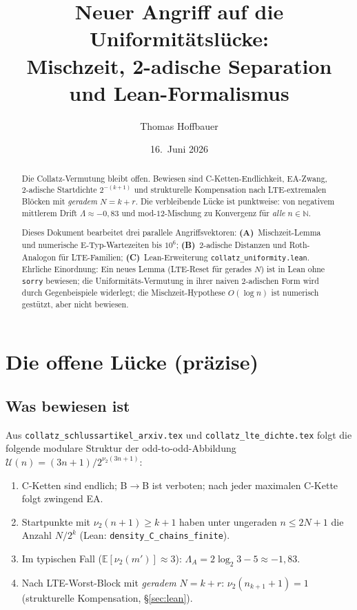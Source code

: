 \documentclass[12pt,a4paper]{article}
\title{%
  Neuer Angriff auf die Uniformitätslücke:\\
  Mischzeit, 2-adische Separation und Lean-Formalismus
}
\author{Thomas Hoffbauer}
\date{16.\ Juni 2026}
\newcommand{\vii}{\nu_2}
\newcommand{\N}{\mathbb{N}}
\newcommand{\U}{\mathcal{U}}
\newcommand{\Lam}{\Lambda}
\begin{document}
\maketitle

\begin{abstract}
Die Collatz-Vermutung bleibt offen. Bewiesen sind C-Ketten-Endlichkeit,
EA-Zwang, 2-adische Startdichte $2^{-(k+1)}$ und strukturelle Kompensation
nach LTE-extremalen Blöcken mit \emph{geradem} $N=k+r$.
Die verbleibende Lücke ist punktweise: von negativem mittlerem Drift
$\Lam\approx -0{,}83$ und mod-$12$-Mischung zu Konvergenz für \emph{alle}
$n\in\N$.

Dieses Dokument bearbeitet drei parallele Angriffsvektoren:
\textbf{(A)}~Mischzeit-Lemma und numerische E-Typ-Wartezeiten bis $10^6$;
\textbf{(B)}~2-adische Distanzen und Roth-Analogon für LTE-Familien;
\textbf{(C)}~Lean-Erweiterung \texttt{collatz\_uniformity.lean}.
Ehrliche Einordnung: Ein neues Lemma (LTE-Reset für gerades $N$) ist in Lean
ohne \texttt{sorry} bewiesen; die Uniformitäts-Vermutung in ihrer
naiven 2-adischen Form wird durch Gegenbeispiele widerlegt; die
Mischzeit-Hypothese $O(\log n)$ ist numerisch gestützt, aber nicht bewiesen.
\end{abstract}

\tableofcontents
\newpage

\section{Die offene Lücke (präzise)}
\label{sec:luecke}

\subsection{Was bewiesen ist}

Aus \texttt{collatz\_schlussartikel\_arxiv.tex} und
\texttt{collatz\_lte\_dichte.tex} folgt die folgende modulare Struktur
der odd-to-odd-Abbildung $\U(n)=(3n+1)/2^{\vii(3n+1)}$:

\begin{enumerate}[label=(\roman*)]
  \item C-Ketten sind endlich; B$\to$B ist verboten; nach jeder maximalen
    C-Kette folgt zwingend EA.
  \item Startpunkte mit $\vii(n+1)\geq k+1$ haben unter ungeraden
    $n\leq 2N+1$ die Anzahl $N/2^k$ (Lean: \texttt{density\_C\_chains\_finite}).
  \item Im typischen Fall ($\mathbb{E}[\vii(m')]\approx 3$):
    $\Lam_A=2\log_2 3-5\approx -1{,}83$.
  \item Nach LTE-Worst-Block mit \emph{geradem} $N=k+r$:
    $\vii(n_{k+1}+1)=1$ (strukturelle Kompensation, §\ref{sec:lean}).
\end{enumerate}
\end{document}
